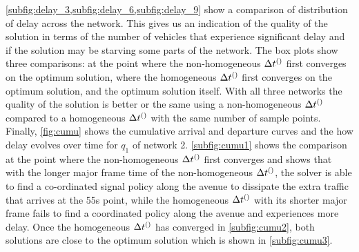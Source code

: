 \cref{subfig:delay_3,subfig:delay_6,subfig:delay_9} show a comparison of 
distribution of delay across the network. This gives us an indication of the 
quality of the solution in terms of the number of 
vehicles that experience significant delay and if the solution may be starving some 
parts of the network.  The box plots show three comparisons: at the point where 
the non-homogeneous $\DT[]$ first 
converges on the optimum solution, where the homogeneous $\DT[]$ first 
converges on the optimum solution, and the optimum solution itself. With all three 
networks the quality of the solution is better 
or  the same using a non-homogeneous $\DT[]$ compared to a 
homogeneous $\DT[]$ with the same number of sample points.
Finally, \cref{fig:cumu} shows the cumulative arrival and departure curves and 
the how delay evolves over time for $q_1$ of network 2. \cref{subfig:cumu1} 
shows the comparison at the point where 
the non-homogeneous $\DT[]$ first converges and shows that with the longer 
major frame time of the non-homogeneous $\DT[]$, the solver is able to find a 
co-ordinated signal policy along the 
avenue to dissipate the extra traffic that arrives at the 55s point, while the 
homogeneous $\DT[]$ with its shorter major frame fails to find a coordinated 
policy along the avenue and experiences more delay. Once the 
homogeneous $\DT[]$ has converged in \cref{subfig:cumu2}, both solutions are 
close to the optimum solution which is shown in \cref{subfig:cumu3}.

